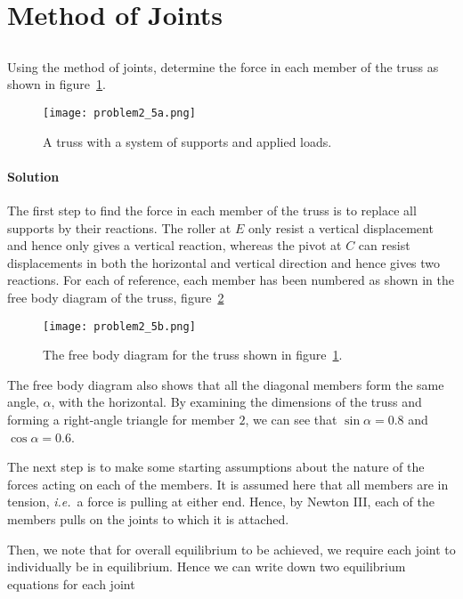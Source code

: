 \documentclass[a4paper,justified,oneside]{tufte-handout}
\numberwithin{equation}{subsection}
\begin{document}
\clearpage
\section{Method of Joints}
\subsection{}
Using the method of joints, determine the force in each member of the truss as shown in figure~\ref{A3:fig:Q5a}.
\begin{figure}
	\centering
	\texttt{[image: problem2\_5a.png]}
	\caption{A truss with a system of supports and applied loads.}
	\label{A3:fig:Q5a}
\end{figure}

\begin{solution}
\paragraph{Solution}
The first step to find the force in each member of the truss is to replace all supports by their reactions. The roller at $E$ only resist a vertical displacement and hence only gives a vertical reaction, whereas the pivot at $C$ can resist displacements in both the horizontal and vertical direction and hence gives two reactions. For each of reference, each member has been numbered as shown in the free body diagram of the truss, figure~\ref{A3:fig:Q5b}
\begin{figure}
	\centering
	\texttt{[image: problem2\_5b.png]}
	\caption{The free body diagram for the truss shown in figure~\protect\ref{A3:fig:Q5a}.}
	\label{A3:fig:Q5b}
\end{figure}

The free body diagram also shows that all the diagonal members form the same angle, $\alpha$, with the horizontal. By examining the dimensions of the truss and forming a right-angle triangle for member $2$, we can see that $\sin\alpha=0.8$ and $\cos\alpha=0.6$.

The next step is to make some starting assumptions about the nature of the forces acting on each of the members. It is assumed here that all members are in tension, \textit{i.e.}~a force is pulling at either end. Hence, by Newton III, each of the members pulls on the joints to which it is attached.

Then, we note that for overall equilibrium to be achieved, we require each joint to individually be in equilibrium. Hence we can write down two equilibrium equations for each joint


\end{solution}
\end{document}
